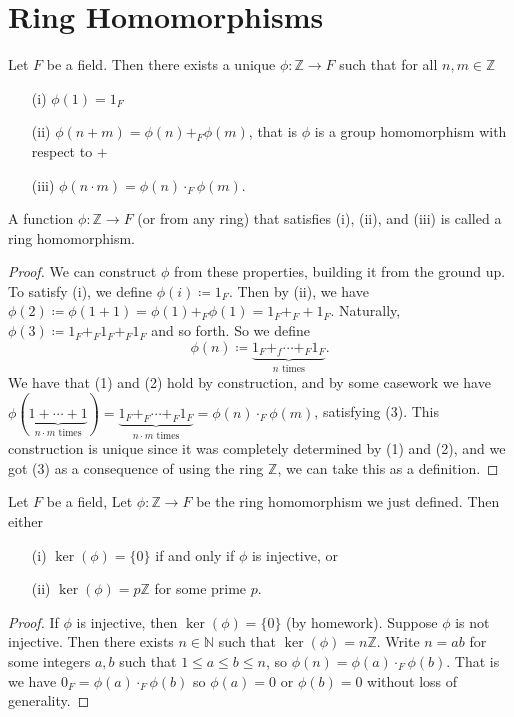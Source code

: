 \section{Ring Homomorphisms}
\begin{lemma}
	Let \(F\) be a field. Then there exists a unique \(\phi \colon \mathbb{Z} \to F\) such that for all \(n,m \in \mathbb{Z} \)
	\begin{itemize}
		\item[(i)] \(\phi (1) = 1_F\)
		\item[(ii)] \(\phi (n+m) = \phi (n) +_F \phi (m)\), that is \(\phi \) is a group homomorphism with respect to \(+\)
		\item[(iii)] \(\phi (n\cdot m) = \phi (n) \cdot_F \phi (m)\).
	\end{itemize}
	\begin{lingo}
		A function \(\phi \colon \mathbb{Z} \to F \) (or from any ring) that satisfies (i), (ii), and (iii) is called a ring homomorphism.
	\end{lingo}
\end{lemma}
\begin{proof}
	We can construct \(\phi \) from these properties, building it from the ground up. To satisfy (i), we define \(\phi (i)\coloneqq 1_F\). Then by (ii), we have \(\phi (2)\coloneqq \phi (1+1) = \phi (1) +_F \phi (1) = 1_F +_F + 1_F\). Naturally, \(\phi (3) \coloneqq  1_F +_F 1_F +_F 1_F \) and so forth. So we define
	\[
		\phi (n)\coloneqq \underbrace{1_F +_f \cdots +_F 1_F}_{n \text{ times} }.
	\]
	We have that (1) and (2) hold by construction, and by some casework we have \(\phi (\underbrace{1+ \cdots +1}_{n\cdot m \text{ times} }) = \underbrace{1_F +_F \cdots +_F 1_F}_{n\cdot m \text{ times} } = \phi (n) \cdot_F \phi (m)\), satisfying (3). This construction is unique since it was completely determined by (1) and (2), and we got (3) as a consequence of using the ring \(\mathbb{Z} \), we can take this as a definition.
\end{proof}
\begin{lemma}
	Let \(F\) be a field, Let \(\phi \colon \mathbb{Z} \to F \) be the ring homomorphism we just defined. Then either
	\begin{itemize}
		\item[(i)] \(\ker(\phi ) = \{ 0 \} \) if and only if \(\phi \) is injective, or
		\item[(ii)] \(\ker(\phi ) = p\mathbb{Z} \) for some prime \(p\).
	\end{itemize}
\end{lemma}
\begin{proof}
	If \(\phi \) is injective, then \(\ker (\phi ) = \{ 0 \} \) (by homework). Suppose \(\phi \) is not injective. Then there exists \(n \in \mathbb{N} \) such that \(\ker (\phi ) = n\mathbb{Z} \). Write \(n=ab\) for some integers \(a,b\) such that \(1\leq a\leq b\leq n\), so \(\phi (n) = \phi (a) \cdot_F \phi (b)\). That is we have \(0_F = \phi (a) \cdot _F \phi (b) \) so \(\phi (a) =0\) or \(\phi (b) = 0\) without loss of generality.
\end{proof}

